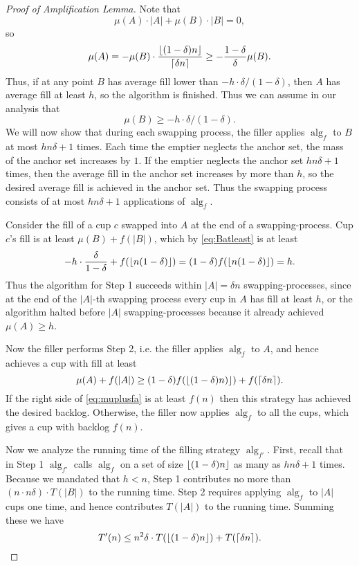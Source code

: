 \documentclass[twocolumn]{article}[10pt]
\DeclareMathOperator{\alg}{\text{alg}}
\DeclarePairedDelimiter\ceil{\lceil}{\rceil}
\DeclarePairedDelimiter\floor{\lfloor}{\rfloor}
\begin{document}
\begin{proof}[Proof of Amplification Lemma]
  Note that $$\mu(A) \cdot |A| + \mu(B)\cdot |B| = 0,$$ so
  $$\mu(A) = - \mu(B) \cdot
  \frac{\floor{(1-\delta)n}}{\ceil{\delta n}} \ge -
  \frac{1-\delta}{\delta} \mu(B).$$ Thus, if at any
  point $B$ has average fill lower than $-h \cdot
  \delta/(1-\delta)$, then $A$ has average fill at least $h$, so
  the algorithm is finished. Thus we can assume in our analysis that
  \begin{equation}
    \mu(B) \ge -h\cdot\delta/(1-\delta).
  \label{eq:Batleast}
  \end{equation}
  We will now show that during each swapping process, the filler
  applies $\alg_f$ to $B$ at most $h n \delta + 1$ times. 
  Each time the emptier neglects the anchor set, the mass of the
  anchor set increases by $1$. If the emptier neglects the anchor set $h
  n\delta + 1$ times, then the average fill in the anchor set increases by
  more than $h$, so the desired average fill is achieved in the
  anchor set. Thus the swapping process consists of at most
  $hn\delta + 1$ applications of $\alg_f$.  

  Consider the fill of a cup $c$ swapped into $A$ at the end of a
  swapping-process. Cup $c$'s fill is at least $\mu(B) + f(|B|)$,
  which by \eqref{eq:Batleast} is at least
  $$-h \cdot \frac{\delta}{1-\delta} + f(\floor{n (1-\delta)}) =
  (1-\delta)f(\floor{n (1-\delta)}) = h.$$ 
  Thus the algorithm for Step 1 succeeds within $|A| =
  \delta n$ swapping-processes, since at the end of the $|A|$-th
  swapping process every cup in $A$ has fill at least $h$, or
  the algorithm halted before $|A|$ swapping-processes because it
  already achieved $\mu(A) \ge h$. 
  
  Now the filler performs Step 2, i.e. the filler applies
  $\alg_f$ to $A$, and hence achieves a cup with fill at least 
  \begin{equation}
    \label{eq:muplusfa}
  \mu(A) + f(|A|) \ge (1-\delta)f(\floor{(1-\delta)n)}) +
  f(\ceil{\delta n}).
  \end{equation}
  If the right side of \eqref{eq:muplusfa} is at least $f(n)$
  then this strategy has achieved the desired backlog. Otherwise, the
  filler now applies $\alg_f$ to all the cups, which gives a cup
  with backlog $f(n)$.

  Now we analyze the running time of the filling strategy
  $\alg_{f'}$. First, recall that in Step 1 $\alg_{f'}$ calls $\alg_f$ on a
  set of size $\floor{(1-\delta)n}$ as many as $hn\delta +1$ times.
  Because we mandated that $h < n$, Step 1 contributes no more
  than $(n\cdot n\delta) \cdot T(|B|)$ to the running time.
  Step 2 requires applying $\alg_f$ to $|A|$ cups one time, and hence
  contributes $T(|A|)$ to the running time. Summing these we have
  $$T'(n) \le n^2\delta \cdot T(\floor{(1-\delta)n}) + T(\ceil{\delta n}).$$

\end{proof}
\end{document}

